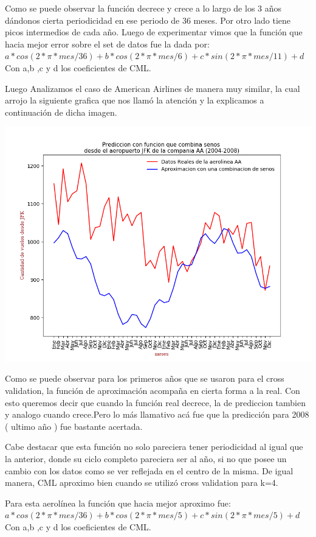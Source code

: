\documentclass{endm}
\begin{document}
Como se puede observar la función decrece y crece a lo largo de los 3 años dándonos cierta periodicidad en ese periodo de 36 meses. Por otro lado tiene picos intermedios de cada año. Luego de experimentar vimos que la función que hacia mejor error sobre el set de datos fue la dada por:
$ a* cos(2* \pi *mes/36)+b*cos(2* \pi*mes/6)+c*sin(2*\pi*mes/11)+d$
Con a,b ,c y d los coeficientes de CML.

Luego Analizamos el caso de American Airlines de manera muy similar, la cual arrojo la siguiente grafica que nos llamó la atención y la explicamos a continuación de dicha imagen.

\begin{center}
\includegraphics[scale=0.6]{imagenes/nuevas/AACantSeno.png}
\end{center}

Como se puede observar para los primeros años que se usaron para el cross validation, la función de aproximación acompaña en cierta forma a la real. Con esto queremos decir que cuando la función real decrece, la de prediccion tambien y analogo cuando crece.Pero lo más llamativo acá fue que la predicción para 2008 ( ultimo año ) fue bastante acertada.

Cabe destacar que esta función no solo pareciera tener periodicidad al igual que la anterior, donde su ciclo completo pareciera ser al año, si no que posee un cambio con los datos como se ver reflejada en el centro de la misma. De igual manera, CML aproximo bien cuando se utilizó cross validation para k=4.

Para esta aerolínea la función que hacia mejor aproximo fue:
$ a* cos(2* \pi *mes/36)+b*cos(2* \pi*mes/5)+c*sin(2*\pi*mes/5)+d$
Con a,b ,c y d los coeficientes de CML.
\end{document}
